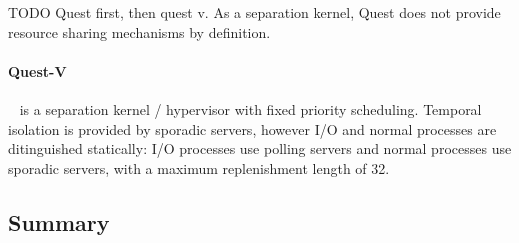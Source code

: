 TODO Quest first, then quest v. 
As a separation kernel, Quest does not provide resource sharing mechanisms by definition. 

\paragraph{Quest-V}~\citep{Danish_LW_11} is a separation kernel / hypervisor with fixed priority scheduling.
Temporal isolation is provided by sporadic servers, however I/O and normal processes are ditinguished statically: I/O processes use polling servers and normal processes use sporadic servers, with a maximum replenishment length of 32.


\subsection{Summary}


